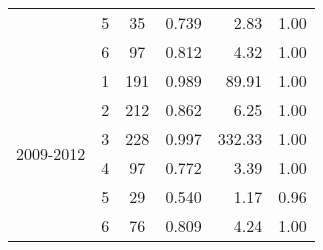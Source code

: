 \begin{table}[htbp]
\begin{tabular}{rrcrrr}
    \multicolumn{1}{c}{} & \multicolumn{1}{c}{5} & \multicolumn{1}{c}{35} & \multicolumn{1}{c}{0.739 } & \multicolumn{1}{r}{2.83 } & \multicolumn{1}{c}{1.00 } \\
    \multicolumn{1}{c}{} & \multicolumn{1}{c}{6} & \multicolumn{1}{c}{97} & \multicolumn{1}{c}{0.812} & \multicolumn{1}{r}{4.32 } & \multicolumn{1}{c}{1.00 } \\\midrule
    \multicolumn{1}{c}{\multirow{6}[2]{*}{\begin{sideways}2009-2012\end{sideways}}} & \multicolumn{1}{c}{1} & \multicolumn{1}{c}{191} & \multicolumn{1}{c}{0.989 } & \multicolumn{1}{r}{89.91 } & \multicolumn{1}{c}{1.00 } \\
    \multicolumn{1}{c}{} & \multicolumn{1}{c}{2} & \multicolumn{1}{c}{212} & \multicolumn{1}{c}{0.862 } & \multicolumn{1}{r}{6.25 } & \multicolumn{1}{c}{1.00 } \\
    \multicolumn{1}{c}{} & \multicolumn{1}{c}{3} & \multicolumn{1}{c}{228} & \multicolumn{1}{c}{0.997 } & \multicolumn{1}{r}{332.33 } & \multicolumn{1}{c}{1.00 } \\
    \multicolumn{1}{c}{} & \multicolumn{1}{c}{4} & \multicolumn{1}{c}{97} & \multicolumn{1}{c}{0.772 } & \multicolumn{1}{r}{3.39 } & \multicolumn{1}{c}{1.00 } \\
    \multicolumn{1}{c}{} & \multicolumn{1}{c}{5} & \multicolumn{1}{c}{29} & \multicolumn{1}{c}{0.540 } & \multicolumn{1}{r}{1.17 } & \multicolumn{1}{c}{0.96 } \\
    \multicolumn{1}{c}{} & \multicolumn{1}{c}{6} & \multicolumn{1}{c}{76} & \multicolumn{1}{c}{0.809} & \multicolumn{1}{r}{4.24 } & \multicolumn{1}{c}{1.00 } \\
    \bottomrule
    \end{tabular}%
  \label{tab:ANCSWPHPA}%
\end{table}%
